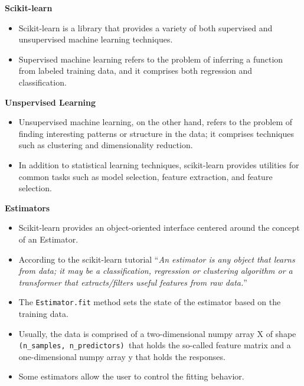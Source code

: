 \documentclass[MASTER.tex]{subfiles}
\begin{document}
\begin{frame}
	\Large
	\textbf{Scikit-learn}\\
	\begin{itemize}
	\item Scikit-learn is a library that provides a variety of both supervised and unsupervised machine learning techniques. 
	\item Supervised machine learning refers to the problem of inferring a function from labeled training data, and it comprises both regression and classification. 
	\end{itemize}


\end{frame}
\begin{frame}
	\Large
	
\textbf{Unspervised Learning}
	\begin{itemize}
		\item	
	Unsupervised machine learning, on the other hand, refers to the problem of finding interesting patterns or structure in the data; it comprises techniques such as clustering and dimensionality reduction.
	\item  In addition to statistical learning techniques, scikit-learn provides utilities for common tasks such as model selection, feature extraction, and feature selection.
\end{itemize}
\end{frame}
\begin{frame}[fragile]
	\LARGE
	\textbf{Estimators}
\begin{itemize}
\item Scikit-learn provides an object-oriented interface centered around the concept of an Estimator. \item According to the scikit-learn tutorial “\textit{An estimator is any object that learns from data; it may be a classification, regression or clustering algorithm or a transformer that extracts/filters useful features from raw data.}” 	
\end{itemize}
\end{frame}


\begin{frame}[fragile]
	\Large
\begin{itemize}
\item The \texttt{Estimator.fit} method sets the state of the estimator based on the training data. 
\item Usually, the data is comprised of a two-dimensional numpy array X of shape \texttt{(n\_samples, n\_predictors) }that holds the so-called feature matrix and a one-dimensional numpy array y that holds the responses. 
\item Some estimators allow the user to control the fitting behavior. 
\end{itemize}
\end{frame}
\end{document}
